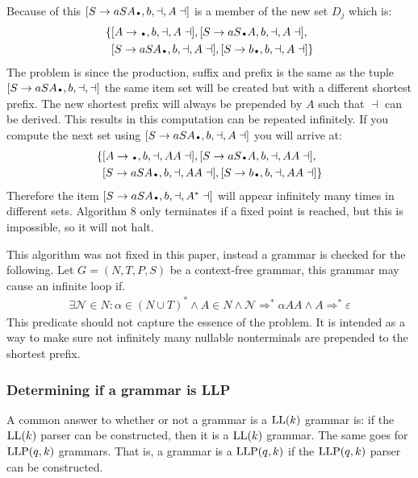 Because of this $[S \to a SA\bigdot, b, \dashv, A \dashv]$ is a member of the new set $D_j$ which is:
\begin{align*}
    \{ &[A \to \bigdot , b, \dashv, A \dashv],[S \to a S\bigdot A, b, \dashv, A \dashv], \\
    & [S \to a S A\bigdot , b, \dashv, A \dashv],[S \to b\bigdot , b, \dashv, A \dashv]\}
\end{align*}
The problem is since the production, suffix and prefix is the same as the tuple $[S \to a S A\bigdot , b, \dashv, \dashv]$ the same item set will be created but with a different shortest prefix. The new shortest prefix will always be prepended by $A$ such that $\dashv$ can be derived. This results in this computation can be repeated infinitely. If you compute the next set using $[S \to a S A\bigdot , b, \dashv, A \dashv]$ you will arrive at:
\begin{align*}
    \{& [A \to \bigdot , b, \dashv, A A \dashv],[S \to a S\bigdot A, b, \dashv, A A \dashv], \\
    & [S \to a S A\bigdot , b, \dashv, A A \dashv],[S \to b\bigdot , b, \dashv, A A \dashv]\}
\end{align*}
Therefore the item $[S \to a S A \bigdot, b, \dashv, A^* \dashv]$ will appear infinitely many times in different sets. Algorithm 8 only terminates if a fixed point is reached, but this is impossible, so it will not halt.

This algorithm was not fixed in this paper, instead a grammar is checked for the following. Let $G = (N, T, P, S)$ be a context-free grammar, this grammar may cause an infinite loop if.
\begin{align*}
    \exists \mathcal{N} \in N : \alpha \in (N \cup T)^* \land A \in N \land \mathcal{N} \Rightarrow^* \alpha AA \land A \Rightarrow^* \varepsilon
\end{align*}
This predicate should not capture the essence of the problem. It is intended as a way to make sure not infinitely many nullable nonterminals are prepended to the shortest prefix.

\subsubsection{Determining if a grammar is LLP}
A common answer to whether or not a grammar is a $\text{LL}(k)$ grammar is: if the $\text{LL}(k)$ parser can be constructed, then it is a $\text{LL}(k)$ grammar. The same goes for $\text{LLP}(q,k)$ grammars. That is, a grammar is a $\text{LLP}(q,k)$ if the $\text{LLP}(q, k)$ parser can be constructed.

